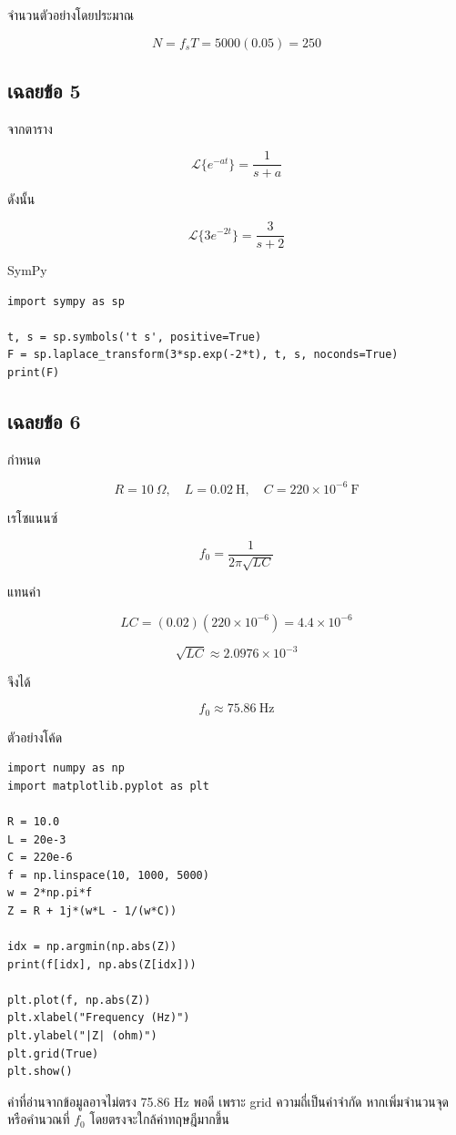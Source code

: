 จำนวนตัวอย่างโดยประมาณ

\[
N=f_sT=5000(0.05)=250
\]

\subsection{เฉลยข้อ 5}

จากตาราง

\[
\mathcal{L}\{e^{-at}\}=\frac{1}{s+a}
\]

ดังนั้น

\[
\mathcal{L}\{3e^{-2t}\}=\frac{3}{s+2}
\]

SymPy

\begin{verbatim}
import sympy as sp

t, s = sp.symbols('t s', positive=True)
F = sp.laplace_transform(3*sp.exp(-2*t), t, s, noconds=True)
print(F)
\end{verbatim}

\subsection{เฉลยข้อ 6}

กำหนด

\[
R=10\ \Omega,\quad L=0.02\ \text{H},\quad C=220\times10^{-6}\ \text{F}
\]

เรโซแนนซ์

\[
f_0=\frac{1}{2\pi\sqrt{LC}}
\]

แทนค่า

\[
LC=(0.02)(220\times10^{-6})=4.4\times10^{-6}
\]

\[
\sqrt{LC}\approx2.0976\times10^{-3}
\]

จึงได้

\[
f_0\approx75.86\ \text{Hz}
\]

ตัวอย่างโค้ด

\begin{verbatim}
import numpy as np
import matplotlib.pyplot as plt

R = 10.0
L = 20e-3
C = 220e-6
f = np.linspace(10, 1000, 5000)
w = 2*np.pi*f
Z = R + 1j*(w*L - 1/(w*C))

idx = np.argmin(np.abs(Z))
print(f[idx], np.abs(Z[idx]))

plt.plot(f, np.abs(Z))
plt.xlabel("Frequency (Hz)")
plt.ylabel("|Z| (ohm)")
plt.grid(True)
plt.show()
\end{verbatim}

ค่าที่อ่านจากข้อมูลอาจไม่ตรง 75.86 Hz พอดี เพราะ grid ความถี่เป็นค่าจำกัด หากเพิ่มจำนวนจุดหรือคำนวณที่ $f_0$ โดยตรงจะใกล้ค่าทฤษฎีมากขึ้น

